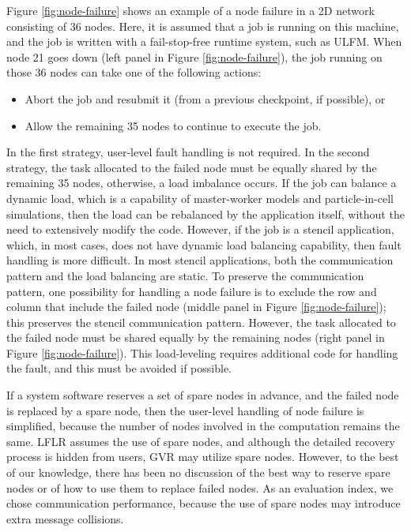 \documentclass[Afour,times,sagev]{sagej}
\begin{document}
Figure \ref{fig:node-failure} shows an example of a node failure in a
2D network consisting of 36 nodes. Here, it is assumed that a job is
running on this machine, and the job is written with a fail-stop-free
runtime system, such as ULFM. When node 21 goes down (left panel in
Figure \ref{fig:node-failure}), the job running on those 36 nodes can
take one of the following actions:

\begin{itemize}
\item Abort the job and resubmit it (from a previous
  checkpoint, if possible), or
\item Allow the remaining 35 nodes to continue to execute the job.
\end{itemize}

In the first strategy, user-level fault handling is not required.
In the second strategy, the task allocated to the failed node must
be equally shared by the remaining 35 nodes, otherwise, a load
imbalance occurs. If the job can balance a dynamic load, which is a
capability of master-worker models and particle-in-cell simulations,
then the load can be rebalanced by the application itself, without the
need to extensively modify the code. However, if the job is a stencil
application, which, in most cases, does not have dynamic load
balancing capability, then fault handling is more difficult. In most
stencil applications, both the communication pattern and the load
balancing are static. To preserve the communication pattern, one
possibility for handling a node failure is to exclude the row and
column that include the failed node (middle panel in Figure
\ref{fig:node-failure}); this preserves the stencil communication
pattern. However, the task allocated to the failed node must be shared
equally by the remaining nodes (right panel in Figure
\ref{fig:node-failure}). This load-leveling requires additional code
for handling the fault, and this must be avoided if possible.

If a system software reserves a set of spare nodes in advance, and the
failed node is replaced by a spare node, then the user-level handling of
node failure is simplified, because the number of nodes involved in
the computation remains the same. LFLR assumes the use of spare nodes,
and although the detailed recovery process is hidden from users, GVR
may utilize spare nodes. However, to the best of our knowledge, there
has been no discussion of the best way to reserve spare nodes or of
how to use them to replace failed nodes. As an evaluation index, we
chose communication performance, because the use of spare nodes may
introduce extra message collisions.
\end{document}
